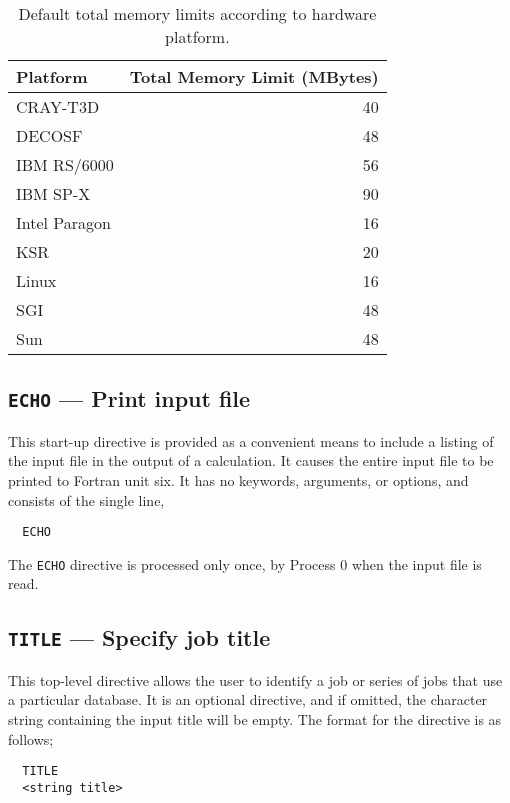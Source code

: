 \begin{table}
\caption{Default total memory limits according to hardware platform.}
\label{tbl:default-memory-limits}
\begin{tabular}{lr}
\hline\hline
Platform        & Total Memory Limit (MBytes) \\
\hline
CRAY-T3D        & 40 \\
DECOSF          & 48 \\
IBM RS/6000     & 56 \\
IBM SP-X        & 90 \\
Intel Paragon   & 16 \\
KSR             & 20 \\
Linux           & 16 \\
SGI             & 48 \\
Sun             & 48 \\
\hline\hline
\end{tabular}
\end{table}

\subsection{{\tt ECHO} --- Print input file}
\label{sec:echo}

This start-up directive is provided as a convenient means to include a
listing of the input file in the output of a calculation.  It causes
the entire input file to be printed to Fortran unit six.  It has no
keywords, arguments, or options, and consists of the single line,

\begin{verbatim}
  ECHO
\end{verbatim}

The \verb+ECHO+ directive is processed only
once, by Process 0 when the input file is read.

\subsection{{\tt TITLE} --- Specify job title}

This top-level directive allows the user to identify a job or series of 
jobs that use a
particular database.  It is an optional directive, and if omitted, the 
character string containing the input title will be empty.  The format for 
the directive is as follows;

\begin{verbatim}
  TITLE 
  <string title>
\end{verbatim}

